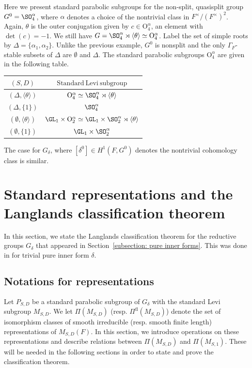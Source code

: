 \documentclass[11pt,letterpaper]{amsart}
\numberwithin{equation}{section}
\begin{document}
\begin{example} 
Here we present standard parabolic subgroups for the non-split, quasisplit group $G^0=\SO_4^\alpha$, where $\alpha$ denotes a choice of the nontrivial class in $F^\times/(F^\times)^2$. Again, $
    \theta$ is the outer conjugation given by $c\in \mathrm{O}_4^\alpha$, an element with $\det(c)=-1.$
    We still have $G=\SO_4^\alpha\rtimes\langle \theta\rangle\simeq \mathrm{O}_4^\alpha$. Label the set of simple roots by $\Delta=\{\alpha_1,\alpha_2\}$. Unlike the previous example, $G^0$ is nonsplit and the only $\Gamma_F$-stable subsets of $\Delta$ are $\emptyset$ and $\Delta$. The standard parabolic subgroups $\mathrm{O}_4^\alpha$ are given in the following table.
\begin{center}
    \begin{tabular}{|c|c|}
    \hline
  $({S}, D)$  & $\mathrm{Standard \ Levi \ subgroup}$  \\
    \hline $(\Delta, \langle \theta \rangle)$    &  $\mathrm{O}_4^\alpha\simeq \SO_4^\alpha\rtimes \langle \theta \rangle$ \\
    \hline $(\Delta, \{1\})$    & $\SO_4^\alpha$   \\
    \hline $(\emptyset,\langle \theta \rangle)$    & $\GL_1\times\mathrm{O}_2^\alpha\simeq\GL_1\times\SO_2^\alpha\rtimes\langle \theta \rangle$ \\
    \hline $(\emptyset, \{1\})$    & $\GL_1\times\SO_2^\alpha$ \\
    \hline
    \end{tabular}
    \end{center}
The case for $G_\delta$, where $[\delta^0]\in H^1(F,G^0)$ denotes the nontrivial cohomology class is similar.
\end{example}






\section{Standard representations and 
the Langlands classification theorem}\label{section: classification theorem}

In this section, we state the Langlands classification theorem for the reductive groups $G_\delta$ that appeared in Section~\ref{subsection: pure inner forms}.
This was done in \cite{BJ01} for trivial pure inner form $\delta$. 




\subsection{\texorpdfstring{Notations for representations}{}}\label{subsection: restriction induction}
Let $P_{S,D}$ be a standard parabolic subgroup of $G_{\delta}$ with the standard Levi subgroup $M_{S,D}$. We let $\Pi(M_{S,D})$ (resp. $\Pi^{\textrm{fl}}(M_{S,D})$) denote the set of isomorphism classes of smooth irreducible (resp. smooth finite length) representations of $M_{S,D}(F)$. In this section, we introduce operations on these representations and describe relations between $\Pi(M_{S,D})$ and $\Pi(M_{S,1})$.
These will be needed in the following sections in order to state and prove the classification theorem.
\end{document}
